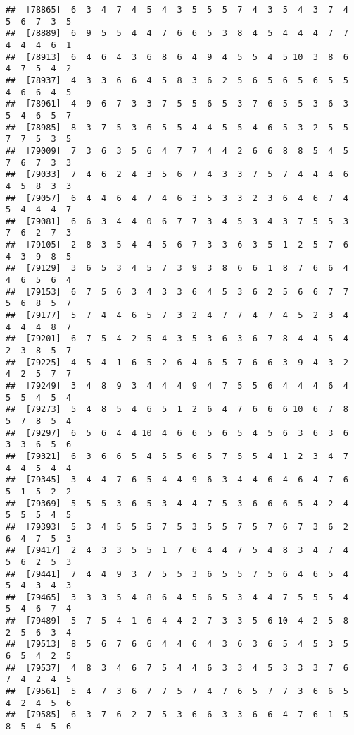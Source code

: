 \documentclass[
]{book}
\begin{document}
\begin{verbatim}
##  [78865]  6  3  4  7  4  5  4  3  5  5  5  7  4  3  5  4  3  7  4  5  6  7  3  5
##  [78889]  6  9  5  5  4  4  7  6  6  5  3  8  4  5  4  4  4  7  7  4  4  4  6  1
##  [78913]  6  4  6  4  3  6  8  6  4  9  4  5  5  4  5 10  3  8  6  4  7  5  4  2
##  [78937]  4  3  3  6  6  4  5  8  3  6  2  5  6  5  6  5  6  5  5  4  6  6  4  5
##  [78961]  4  9  6  7  3  3  7  5  5  6  5  3  7  6  5  5  3  6  3  5  4  6  5  7
##  [78985]  8  3  7  5  3  6  5  5  4  4  5  5  4  6  5  3  2  5  5  7  7  5  3  5
##  [79009]  7  3  6  3  5  6  4  7  7  4  4  2  6  6  8  8  5  4  5  7  6  7  3  3
##  [79033]  7  4  6  2  4  3  5  6  7  4  3  3  7  5  7  4  4  4  6  4  5  8  3  3
##  [79057]  6  4  4  6  4  7  4  6  3  5  3  3  2  3  6  4  6  7  4  5  4  4  4  7
##  [79081]  6  6  3  4  4  0  6  7  7  3  4  5  3  4  3  7  5  5  3  7  6  2  7  3
##  [79105]  2  8  3  5  4  4  5  6  7  3  3  6  3  5  1  2  5  7  6  4  3  9  8  5
##  [79129]  3  6  5  3  4  5  7  3  9  3  8  6  6  1  8  7  6  6  4  4  6  5  6  4
##  [79153]  6  7  5  6  3  4  3  3  6  4  5  3  6  2  5  6  6  7  7  5  6  8  5  7
##  [79177]  5  7  4  4  6  5  7  3  2  4  7  7  4  7  4  5  2  3  4  4  4  4  8  7
##  [79201]  6  7  5  4  2  5  4  3  5  3  6  3  6  7  8  4  4  5  4  2  3  8  5  7
##  [79225]  4  5  4  1  6  5  2  6  4  6  5  7  6  6  3  9  4  3  2  4  2  5  7  7
##  [79249]  3  4  8  9  3  4  4  4  9  4  7  5  5  6  4  4  4  6  4  5  5  4  5  4
##  [79273]  5  4  8  5  4  6  5  1  2  6  4  7  6  6  6 10  6  7  8  5  7  8  5  4
##  [79297]  6  5  6  4  4 10  4  6  6  5  6  5  4  5  6  3  6  3  6  3  3  6  5  6
##  [79321]  6  3  6  6  5  4  5  5  6  5  7  5  5  4  1  2  3  4  7  4  4  5  4  4
##  [79345]  3  4  4  7  6  5  4  4  9  6  3  4  4  6  4  6  4  7  6  5  1  5  2  2
##  [79369]  5  5  5  3  6  5  3  4  4  7  5  3  6  6  6  5  4  2  4  5  5  5  4  5
##  [79393]  5  3  4  5  5  5  7  5  3  5  5  7  5  7  6  7  3  6  2  6  4  7  5  3
##  [79417]  2  4  3  3  5  5  1  7  6  4  4  7  5  4  8  3  4  7  4  5  6  2  5  3
##  [79441]  7  4  4  9  3  7  5  5  3  6  5  5  7  5  6  4  6  5  4  5  4  3  4  3
##  [79465]  3  3  3  5  4  8  6  4  5  6  5  3  4  4  7  5  5  5  4  5  4  6  7  4
##  [79489]  5  7  5  4  1  6  4  4  2  7  3  3  5  6 10  4  2  5  8  2  5  6  3  4
##  [79513]  8  5  6  7  6  6  4  4  6  4  3  6  3  6  5  4  5  3  5  6  5  4  2  5
##  [79537]  4  8  3  4  6  7  5  4  4  6  3  3  4  5  3  3  3  7  6  7  4  2  4  5
##  [79561]  5  4  7  3  6  7  7  5  7  4  7  6  5  7  7  3  6  6  5  4  2  4  5  6
##  [79585]  6  3  7  6  2  7  5  3  6  6  3  3  6  6  4  7  6  1  5  8  5  4  5  6

\end{verbatim}
\end{document}
